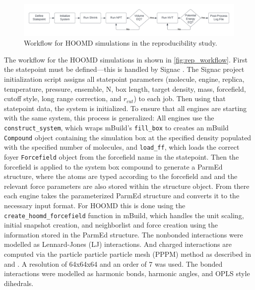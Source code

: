 \begin{figure}[h!]
    \centering
    \includegraphics[width=\linewidth,keepaspectratio]{figures/rep_study/reproducibility_workflow.png}
    \caption{Workflow for HOOMD simulations in the reproducibility study.}\label{fig:rep_workflow}
\end{figure}
The workflow for the HOOMD simulations in shown in \autoref{fig:rep_workflow}. First the statepoint must be defined---this is handled by Signac \cite{Adorf2018, signac_zenodo, signac_scipy_2018, signac_scipy_2021}. The Signac project initialization script assigns all statepoint parameters (molecule, engine, replica, temperature, pressure, ensemble, N, box length, target density, mass, forcefield, cutoff style, long range correction, and $r_{cut}$) to each job. Then using that statepoint data, the system is initialized. To ensure that all engines are starting with the same system, this process is generalized: All engines use the \lstinline{construct_system}, which wraps mBuild's \lstinline{fill_box} to creates an mBuild \lstinline{Compound} object containing the simulation box at the specified density populated with the specified number of molecules, and \lstinline{load_ff}, which loads the correct foyer \lstinline{Forcefield} object from the forcefield name in the statepoint. Then the forcefield is applied to the system box compound to generate a ParmEd structure\cite{Shirts2017}, where the atoms are typed according to the forcefield and and the relevant force parameters are also stored within the structure object. From there each engine takes the parameterized ParmEd structure and converts it to the necessary input format. For HOOMD this is done using the \lstinline{create_hoomd_forcefield} function in mBuild, which handles the unit scaling, initial snapshot creation, and neighborlist and force creation using the information stored in the ParmEd structure. 
The nonbonded interactions were modelled as Lennard-Jones (LJ) interactions. 
And charged interactions are computed via the particle particle particle mesh (PPPM) method as described in \citet{Darden1993} and \citet{Lebard2012}. A resolution of 64x64x64 and an order of 7 was used.
The bonded interactions were modelled as harmonic bonds, harmonic angles, and OPLS style dihedrals.
